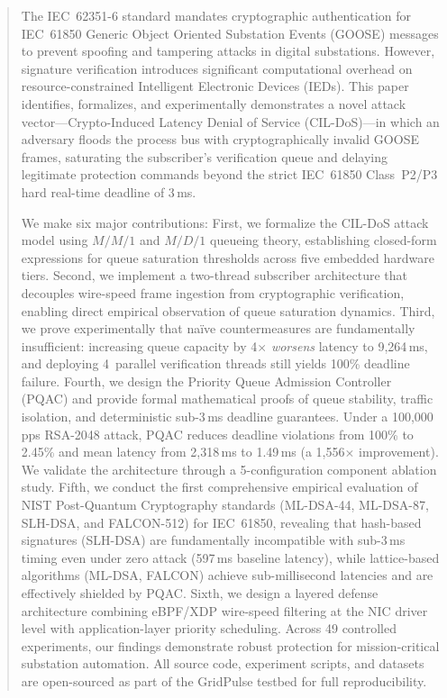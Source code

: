 \documentclass{ieeeaccess}
\begin{document}
\begin{abstract}
The IEC~62351-6 standard mandates cryptographic authentication for IEC~61850 Generic Object Oriented Substation Events (GOOSE) messages to prevent spoofing and tampering attacks in digital substations. However, signature verification introduces significant computational overhead on resource-constrained Intelligent Electronic Devices (IEDs). This paper identifies, formalizes, and experimentally demonstrates a novel attack vector---Crypto-Induced Latency Denial of Service (CIL-DoS)---in which an adversary floods the process bus with cryptographically invalid GOOSE frames, saturating the subscriber's verification queue and delaying legitimate protection commands beyond the strict IEC~61850 Class~P2/P3 hard real-time deadline of 3\,ms.

We make six major contributions:
First, we formalize the CIL-DoS attack model using $M/M/1$ and $M/D/1$ queueing theory, establishing closed-form expressions for queue saturation thresholds across five embedded hardware tiers.
Second, we implement a two-thread subscriber architecture that decouples wire-speed frame ingestion from cryptographic verification, enabling direct empirical observation of queue saturation dynamics.
Third, we prove experimentally that na\"ive countermeasures are fundamentally insufficient: increasing queue capacity by 4$\times$ \emph{worsens} latency to 9,264\,ms, and deploying 4~parallel verification threads still yields 100\% deadline failure.
Fourth, we design the Priority Queue Admission Controller (PQAC) and provide formal mathematical proofs of queue stability, traffic isolation, and deterministic sub-3\,ms deadline guarantees. Under a 100,000\,pps RSA-2048 attack, PQAC reduces deadline violations from 100\% to 2.45\% and mean latency from 2,318\,ms to 1.49\,ms (a 1,556$\times$ improvement). We validate the architecture through a 5-configuration component ablation study.
Fifth, we conduct the first comprehensive empirical evaluation of NIST Post-Quantum Cryptography standards (ML-DSA-44, ML-DSA-87, SLH-DSA, and FALCON-512) for IEC~61850, revealing that hash-based signatures (SLH-DSA) are fundamentally incompatible with sub-3\,ms timing even under zero attack (597\,ms baseline latency), while lattice-based algorithms (ML-DSA, FALCON) achieve sub-millisecond latencies and are effectively shielded by PQAC.
Sixth, we design a layered defense architecture combining eBPF/XDP wire-speed filtering at the NIC driver level with application-layer priority scheduling. Across 49 controlled experiments, our findings demonstrate robust protection for mission-critical substation automation. All source code, experiment scripts, and datasets are open-sourced as part of the GridPulse testbed for full reproducibility.
\end{abstract}
\end{document}
